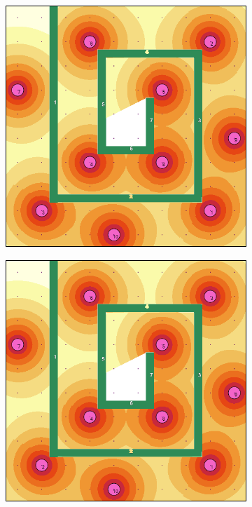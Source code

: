 \documentclass[letterpaper, 10 pt, conference]{ieeeconf}
\begin{document}
\begin{figure}[!h]
\begin{subfigure}[t]{0.3\columnwidth}
    \includegraphics[width=\columnwidth]{Figures/MazeRange350.png}
    \caption{}
\end{subfigure}%
\hfill
\begin{subfigure}[t]{0.3\columnwidth}
    \centering
    \includegraphics[width=\columnwidth]{Figures/MazeRange800.png}
    \caption{}
\end{subfigure}%
\caption{}
\label{Fig:BlankRange}
\end{figure}
\end{document}
